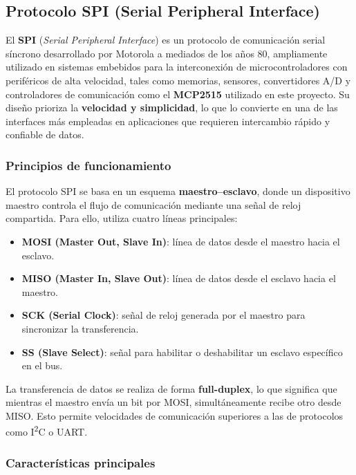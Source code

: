 \subsection{Protocolo SPI (Serial Peripheral Interface)}

El \textbf{SPI} (\textit{Serial Peripheral Interface}) es un protocolo de comunicación serial síncrono desarrollado por Motorola a mediados de los años 80, ampliamente utilizado en sistemas embebidos para la interconexión de microcontroladores con periféricos de alta velocidad, tales como memorias, sensores, convertidores A/D y controladores de comunicación como el \textbf{MCP2515} utilizado en este proyecto. Su diseño prioriza la \textbf{velocidad y simplicidad}, lo que lo convierte en una de las interfaces más empleadas en aplicaciones que requieren intercambio rápido y confiable de datos.

\subsubsection*{Principios de funcionamiento}

El protocolo SPI se basa en un esquema \textbf{maestro–esclavo}, donde un dispositivo maestro controla el flujo de comunicación mediante una señal de reloj compartida. Para ello, utiliza cuatro líneas principales:

\begin{itemize}
    \item \textbf{MOSI (Master Out, Slave In)}: línea de datos desde el maestro hacia el esclavo.
    \item \textbf{MISO (Master In, Slave Out)}: línea de datos desde el esclavo hacia el maestro.
    \item \textbf{SCK (Serial Clock)}: señal de reloj generada por el maestro para sincronizar la transferencia.
    \item \textbf{SS (Slave Select)}: señal para habilitar o deshabilitar un esclavo específico en el bus.
\end{itemize}

La transferencia de datos se realiza de forma \textbf{full-duplex}, lo que significa que mientras el maestro envía un bit por MOSI, simultáneamente recibe otro desde MISO. Esto permite velocidades de comunicación superiores a las de protocolos como I\textsuperscript{2}C o UART.

\subsubsection*{Características principales}

